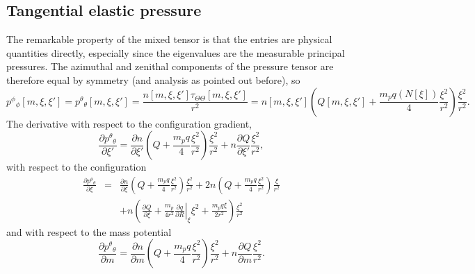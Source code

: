 \subsection{Tangential elastic pressure}
The remarkable property of the mixed tensor is that the entries are physical quantities directly, especially since the eigenvalues are the measurable principal pressures. The azimuthal and zenithal components of the pressure tensor are therefore equal by symmetry (and analysis as pointed out before), so
\begin{equation}
p^\phi{}_\phi[m,\xi,\xi'] = p^\theta{}_\theta[m,\xi,\xi'] = \frac{n[m,\xi,\xi']\tau_{\Theta\Theta}[m,\xi,\xi']}{r^2} = n[m,\xi,\xi']\left(Q[m,\xi,\xi'] +
\frac{m_pq(N[\xi])}{4}\frac{\xi^2}{r^2}\right)\frac{\xi^2}{r^2}.
\label{eq:tangentialPressureExpanded}
\end{equation}
The derivative with respect to the configuration gradient,
\begin{equation}
\frac{\partial p^\theta{}_\theta}{\partial \xi'} = \frac{\partial n}{\partial\xi'}\left(Q +
\frac{m_pq}{4}\frac{\xi^2}{r^2}\right)\frac{\xi^2}{r^2} + n\frac{\partial Q}{\partial \xi'}\frac{\xi^2}{r^2},
\label{eq:dtangentialPressure:dxi}
\end{equation}
with respect to the configuration
\begin{eqnarray}
\nonumber \frac{\partial p^\theta{}_\theta}{\partial \xi} & = & \frac{\partial n}{\partial\xi}\left(Q +
\frac{m_pq}{4}\frac{\xi^2}{r^2}\right)\frac{\xi^2}{r^2} + 2n\left(Q +
\frac{m_pq}{4}\frac{\xi^2}{r^2}\right)\frac{\xi}{r^2} \\
\label{eq:dtangentialPressure:xi} && + n\left(\frac{\partial Q}{\partial \xi} +
\frac{m_p}{4r^2} \left.\frac{\partial q}{\partial R}\right|_\xi \xi^2 + \frac{m_pq\xi}{2r^2} \right)\frac{\xi^2}{r^2}
\end{eqnarray}
and with respect to the mass potential
\begin{equation}
\frac{\partial p^\theta{}_\theta}{\partial m} = \frac{\partial n}{\partial m}\left(Q +
\frac{m_pq}{4}\frac{\xi^2}{r^2}\right)\frac{\xi^2}{r^2} + n\frac{\partial Q}{\partial m} \frac{\xi^2}{r^2}.
\label{eq:dtangentialPressure:m}
\end{equation}

